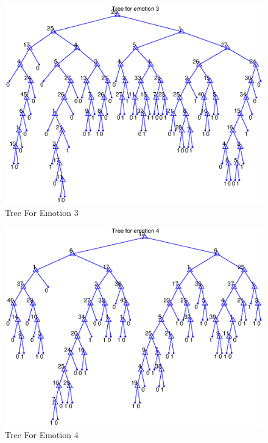 \documentclass[11pt,a4paper]{article}
\begin{document}
\begin{figure}[!hb]
	\centering
	\includegraphics[width=\textwidth]{trees/tree3.eps}
     \caption{Tree For Emotion 3}
     \label{fig:tree3}
\end{figure}
\begin{figure}[!ht]
	\centering
	\includegraphics[width=\textwidth]{trees/tree4.eps}
     \caption{Tree For Emotion 4}
     \label{fig:tree4}
\end{figure}
\end{document}
